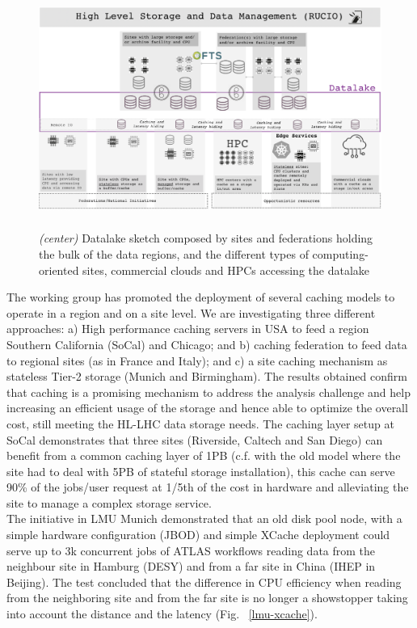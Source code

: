 \begin{figure}
  \centering
  \includegraphics[height=7.8cm]{datalake-sketch-square.png}
  \caption{{\em (center)} Datalake sketch composed by sites and federations holding the bulk of the data regions, and the different types of computing-oriented sites, commercial clouds and HPCs accessing the datalake }
  \label{datalake-sketch}
\end{figure}
The working group has promoted the deployment of several caching models to operate in a region and on a site level. We are investigating three different approaches: a) High performance caching servers in USA to feed a region Southern California (SoCal) and Chicago; and b) caching federation to feed data to regional sites (as in France and Italy); and c) a site caching mechanism as stateless Tier-2 storage (Munich and Birmingham). The results obtained confirm that caching is a promising mechanism to address the analysis challenge and help increasing an efficient usage of the storage and hence able to optimize the overall cost, still meeting the
HL-LHC data storage needs. The caching layer setup at SoCal demonstrates that three sites (Riverside, Caltech and San Diego) can benefit from a common caching layer of 1PB (c.f. with the old model where the site had to deal with 5PB of stateful storage installation), this cache can serve 90\% of the jobs/user request at 1/5th of the cost in hardware and alleviating the site to manage a complex storage service.\\
The initiative in LMU Munich demonstrated that an old disk pool node, with a simple hardware configuration (JBOD) and simple XCache deployment could serve up to 3k concurrent jobs of ATLAS workflows reading data from the neighbour site in Hamburg (DESY) and from a far site in China (IHEP in Beijing). The test concluded that the difference in CPU efficiency when reading from the neighboring site and from the far site is no longer a showstopper taking into account the distance and the latency (Fig. ~\ref{lmu-xcache}).\\

